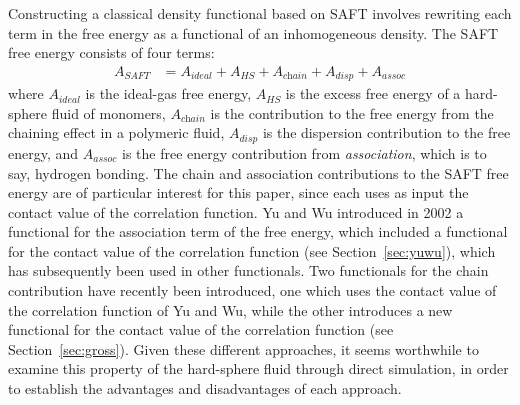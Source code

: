 \documentclass[letterpaper,twocolumn,amsmath,amssymb,jcp,10pt,aip]{revtex4-1}
\begin{document}
Constructing a classical density functional based on SAFT involves
rewriting each term in the free energy as a functional of an
inhomogeneous density.  The SAFT free energy consists of four terms:
\begin{align}
  A_\textit{SAFT} &= A_\textit{ideal} + A_\textit{HS} + A_\textit{chain} + A_\textit{disp} + A_\textit{assoc}
\end{align}
where $A_\textit{ideal}$ is the ideal-gas free energy, $A_\textit{HS}$
is the excess free energy of a hard-sphere fluid of monomers,
$A_\textit{chain}$ is the contribution to the free energy from the
chaining effect in a polymeric fluid, $A_\textit{disp}$ is the
dispersion contribution to the free energy, and $A_\textit{assoc}$ is
the free energy contribution from \emph{association}, which is to say,
hydrogen bonding.  The chain and association contributions to the SAFT
free energy are of particular interest for this paper, since each uses
as input the contact value of the correlation function.
%
Yu and Wu introduced in 2002 a functional for the association term of
the free energy, which included a functional for the contact value of
the correlation function (see
Section~\ref{sec:yuwu})\cite{yu2002fmt-dft-inhomogeneous-associating},
which has subsequently been used in other
functionals\cite{fu2005vapor-liquid-dft, bryk2006density}.
Two functionals for the chain contribution have recently been
introduced\cite{bryk2006density, gross2009density}, one which uses the
contact value of the correlation function of Yu and
Wu\cite{bryk2006density}, while the other introduces a new functional
for the contact value of the correlation
function (see Section~\ref{sec:gross})\cite{gross2009density}.
Given these different approaches, it seems worthwhile to examine this
property of the hard-sphere fluid through direct simulation, in order
to establish the advantages and disadvantages of each approach.
\end{document}
